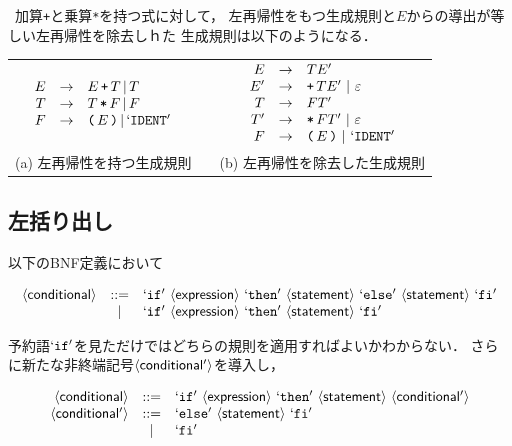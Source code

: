 \documentclass[dvipdfmx,a4j]{jbook}
\begin{document}
\begin{Exmp}\ 加算\texttt{+}と乗算\texttt{*}を持つ式に対して，
  左再帰性をもつ生成規則と$E$からの導出が等しい左再帰性を除去しｈた
  生成規則は以下のようになる．
  \begin{center}
  \begin{tabular}{ccc}
    $\begin{array}{rcl}
      E & \rightarrow & E\,\texttt{+}\,T\,|\,T\\
      T & \rightarrow & T\,\texttt{*}\,F\,|\,F\\
      F & \rightarrow & \texttt{(}\,E\,\texttt{)}\,|\,`\mbox{$\mathtt{IDENT}$}'
    \end{array}$
    & &
    $\begin{array}{rcl}
      E & \rightarrow & TE'\\
      E'& \rightarrow & \texttt{+}\,TE'\ |\ \varepsilon\\
      T & \rightarrow & FT'\\
      T'& \rightarrow & \texttt{*}\,FT'\ |\ \varepsilon\\
      F & \rightarrow & \texttt{(}\,E\,\texttt{)}\ |\ \Term{IDENT}
    \end{array}$\\
     (a) 左再帰性を持つ生成規則 & & (b) 左再帰性を除去した生成規則
  \end{tabular}
\end{center}
\end{Exmp}

\subsection{左括り出し}

以下のBNF定義において

\[\begin{array}{rcl}
  \NTerm{conditional} & \mathtt{::=} & \Term{if}\ \NTerm{expression}\ \Term{then}\ \NTerm{statement}\ \Term{else}\ \NTerm{statement}\ \Term{fi}\\
  & | & \Term{if}\ \NTerm{expression}\ \Term{then}\ \NTerm{statement}\ \Term{fi}
\end{array}\]

予約語$`\mbox{$\mathtt{if}$}'$を見ただけではどちらの規則を適用すればよいかわからない．
さらに新たな非終端記号$\langle{\mbox{$\mathsf{conditional'}$}}\rangle$を導入し，

\[\begin{array}{rcl}
  \NTerm{conditional} & \mathtt{::=} & \Term{if}\ \NTerm{expression}\ \Term{then}\ \NTerm{statement}\ \NTerm{conditional'}\\
  \NTerm{conditional'}& \mathtt{::=} & \Term{else}\ \NTerm{statement}\ \Term{fi}\\
  & | & \Term{fi}
\end{array}\]
\end{document}
